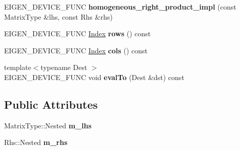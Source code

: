 \begin{DoxyCompactItemize}
E\+I\+G\+E\+N\+\_\+\+D\+E\+V\+I\+C\+E\+\_\+\+F\+U\+NC {\bfseries homogeneous\+\_\+right\+\_\+product\+\_\+impl} (const Matrix\+Type \&lhs, const Rhs \&rhs)
\item 
\mbox{\label{struct_eigen_1_1internal_1_1homogeneous__right__product__impl_3_01_homogeneous_3_01_matrix_type_ef182dac64ca84d6bf223cfad456dbfc_a7281f1c7856b24c566c5966e12e48e66}} 
E\+I\+G\+E\+N\+\_\+\+D\+E\+V\+I\+C\+E\+\_\+\+F\+U\+NC \hyperlink{namespace_eigen_a62e77e0933482dafde8fe197d9a2cfde}{Index} {\bfseries rows} () const
\item 
\mbox{\label{struct_eigen_1_1internal_1_1homogeneous__right__product__impl_3_01_homogeneous_3_01_matrix_type_ef182dac64ca84d6bf223cfad456dbfc_aeabda2f4767201418b52b2d7e85f32c8}} 
E\+I\+G\+E\+N\+\_\+\+D\+E\+V\+I\+C\+E\+\_\+\+F\+U\+NC \hyperlink{namespace_eigen_a62e77e0933482dafde8fe197d9a2cfde}{Index} {\bfseries cols} () const
\item 
\mbox{\label{struct_eigen_1_1internal_1_1homogeneous__right__product__impl_3_01_homogeneous_3_01_matrix_type_ef182dac64ca84d6bf223cfad456dbfc_a59c3f812a22ed4626483371ad1ad68df}} 
{\footnotesize template$<$typename Dest $>$ }\\E\+I\+G\+E\+N\+\_\+\+D\+E\+V\+I\+C\+E\+\_\+\+F\+U\+NC void {\bfseries eval\+To} (Dest \&dst) const
\end{DoxyCompactItemize}
\subsection*{Public Attributes}
\begin{DoxyCompactItemize}
\item 
\mbox{\label{struct_eigen_1_1internal_1_1homogeneous__right__product__impl_3_01_homogeneous_3_01_matrix_type_ef182dac64ca84d6bf223cfad456dbfc_aff928a258b6821f8366504e9b9492b7f}} 
Matrix\+Type\+::\+Nested {\bfseries m\+\_\+lhs}
\item 
\mbox{\label{struct_eigen_1_1internal_1_1homogeneous__right__product__impl_3_01_homogeneous_3_01_matrix_type_ef182dac64ca84d6bf223cfad456dbfc_a298ef9c36d79981d066125b8e5741e29}} 
Rhs\+::\+Nested {\bfseries m\+\_\+rhs}
\end{DoxyCompactItemize}


